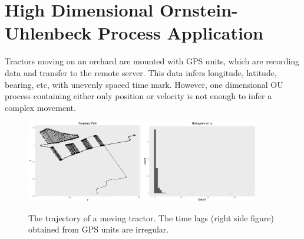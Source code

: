 \section{High Dimensional Ornstein-Uhlenbeck Process Application}\label{SectionHighDimensionalOU}

Tractors moving on an orchard are mounted with GPS units, which are recording data and transfer to the remote server. This data infers longitude, latitude, bearing, etc, with unevenly spaced time mark. However, one dimensional OU process containing either only position or velocity is not enough to infer a complex movement. 

\begin{figure}[h]
\centering
\includegraphics[width=0.45\textwidth]{Chapters/05MCMCOU/plots/realdatapath.pdf}
\includegraphics[width=0.45\textwidth]{Chapters/05MCMCOU/plots/realdatahistdeltaT.pdf}
\caption{The trajectory of a moving tractor. The time lags (right side figure) obtained from GPS units are irregular.}
\label{realdatareview}
\end{figure}

